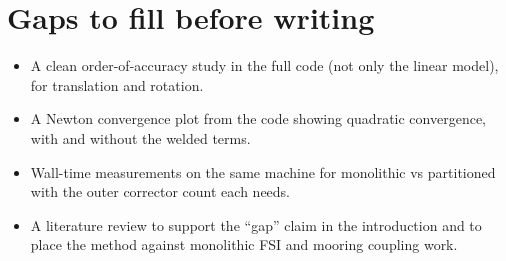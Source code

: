 \documentclass[11pt,a4paper]{article}
\begin{document}
\section*{Gaps to fill before writing}

\begin{itemize}
  \item A clean order-of-accuracy study in the full code (not only the
        linear model), for translation and rotation.
  \item A Newton convergence plot from the code showing quadratic
        convergence, with and without the welded terms.
  \item Wall-time measurements on the same machine for monolithic vs
        partitioned with the outer corrector count each needs.
  \item A literature review to support the ``gap'' claim in the
        introduction and to place the method against monolithic FSI and
        mooring coupling work.
\end{itemize}
\end{document}
